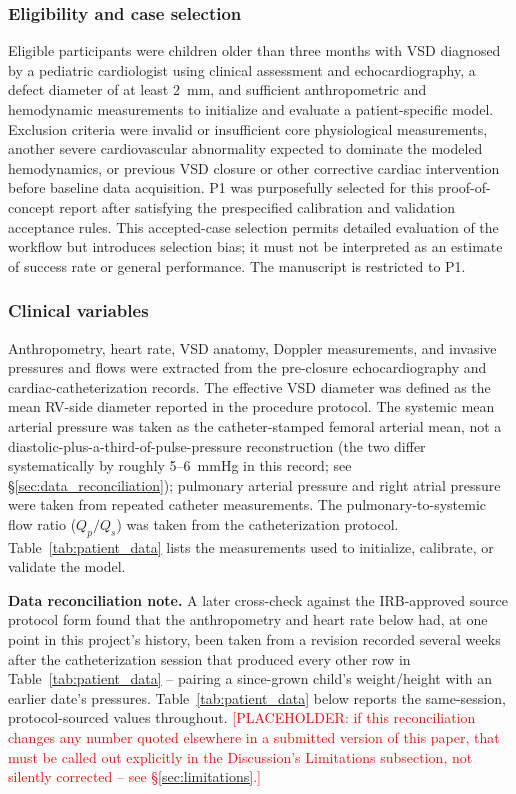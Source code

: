 \documentclass{article}
\begin{document}
\subsubsection{Eligibility and case selection}

Eligible participants were children older than three months with VSD diagnosed by a pediatric cardiologist using clinical assessment and echocardiography, a defect diameter of at least 2~mm, and sufficient anthropometric and hemodynamic measurements to initialize and evaluate a patient-specific model. Exclusion criteria were invalid or insufficient core physiological measurements, another severe cardiovascular abnormality expected to dominate the modeled hemodynamics, or previous VSD closure or other corrective cardiac intervention before baseline data acquisition. P1 was purposefully selected for this proof-of-concept report after satisfying the prespecified calibration and validation acceptance rules. This accepted-case selection permits detailed evaluation of the workflow but introduces selection bias; it must not be interpreted as an estimate of success rate or general performance. The manuscript is restricted to P1.

\subsubsection{Clinical variables}

Anthropometry, heart rate, VSD anatomy, Doppler measurements, and invasive pressures and flows were extracted from the pre-closure echocardiography and cardiac-catheterization records. The effective VSD diameter was defined as the mean RV-side diameter reported in the procedure protocol. The systemic mean arterial pressure was taken as the catheter-stamped femoral arterial mean, not a diastolic-plus-a-third-of-pulse-pressure reconstruction (the two differ systematically by roughly 5--6~mmHg in this record; see \S\ref{sec:data_reconciliation}); pulmonary arterial pressure and right atrial pressure were taken from repeated catheter measurements. The pulmonary-to-systemic flow ratio ($Q_p/Q_s$) was taken from the catheterization protocol. Table~\ref{tab:patient_data} lists the measurements used to initialize, calibrate, or validate the model.

\textbf{\label{sec:data_reconciliation}Data reconciliation note.} A later cross-check against the IRB-approved source protocol form found that the anthropometry and heart rate below had, at one point in this project's history, been taken from a revision recorded several weeks after the catheterization session that produced every other row in Table~\ref{tab:patient_data} -- pairing a since-grown child's weight/height with an earlier date's pressures. Table~\ref{tab:patient_data} below reports the same-session, protocol-sourced values throughout. \textcolor{red}{[PLACEHOLDER: if this reconciliation changes any number quoted elsewhere in a submitted version of this paper, that must be called out explicitly in the Discussion's Limitations subsection, not silently corrected -- see \S\ref{sec:limitations}.]}
\end{document}

